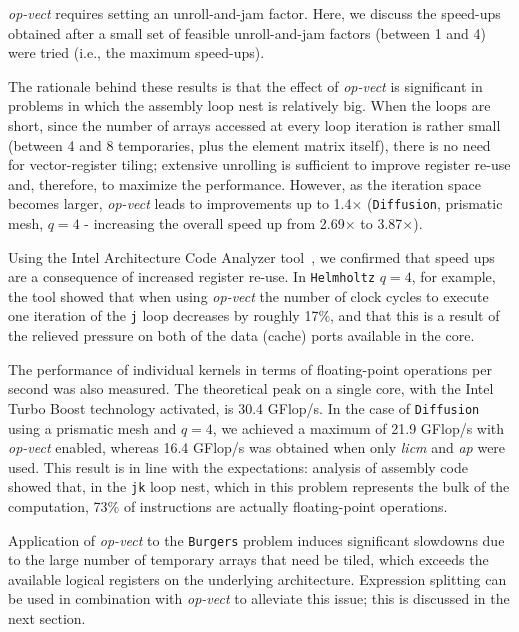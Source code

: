 \emph{op-vect} requires setting an unroll-and-jam factor. Here, we discuss the speed-ups obtained after a small set of feasible unroll-and-jam factors (between 1 and 4) were tried (i.e., the maximum speed-ups). 

The rationale behind these results is that the effect of \emph{op-vect} is significant in problems in which the assembly loop nest is relatively big. When the loops are short, since the number of arrays accessed at every loop iteration is rather small (between 4 and 8 temporaries, plus the element matrix itself), there is no need for
vector-register tiling; extensive unrolling is sufficient to improve register re-use and, therefore, to maximize the performance. However, as the iteration space becomes larger, \emph{op-vect} leads to improvements up to 1.4$\times$ ({\tt Diffusion}, prismatic mesh, $q=4$ - increasing the overall speed up from 2.69$\times$ to 3.87$\times$).

Using the Intel Architecture Code Analyzer tool~\citep{IACA}, we confirmed that speed ups are a consequence of increased register re-use. In {\tt Helmholtz} $q=4$, for example, the tool showed that when using \emph{op-vect} the number of clock cycles to execute one iteration of the \texttt{j} loop decreases by roughly 17$\%$, and that this is a result of the relieved pressure on both of the data (cache) ports available in the core.

The performance of individual kernels in terms of floating-point operations per second was also measured. The theoretical peak on a single core, with the Intel Turbo Boost technology activated, is 30.4 GFlop/s. In the case of {\tt Diffusion} using a prismatic mesh and $q=4$, we achieved a maximum of 21.9 GFlop/s with \emph{op-vect} enabled, whereas 16.4 GFlop/s was obtained when only \emph{licm} and \emph{ap} were used. This result is in line with the expectations: analysis of assembly code showed that, in the \texttt{jk} loop nest, which in this problem represents the bulk of the computation, 73$\%$ of instructions are actually floating-point operations.

Application of \emph{op-vect} to the {\tt Burgers} problem induces significant slowdowns due to the large number of temporary arrays that need be tiled, which exceeds the available logical registers on the underlying architecture. Expression splitting can be used in combination with \emph{op-vect} to alleviate this issue; this is discussed in the next section.


